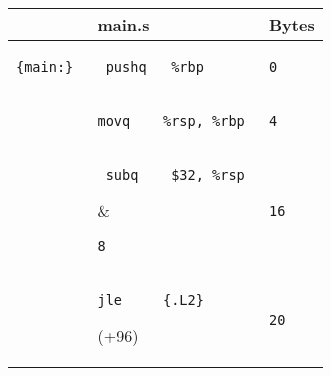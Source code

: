 \documentclass{ti2}
\begin{document}
\begin{tabular}{ | l | l | l|} \hline
  &  main.s & Bytes \\ \hline
\begin{lstlisting}
{main:} 
\end{lstlisting} &
\begin{lstlisting}
 pushq   %rbp 
\end{lstlisting} &
\begin{lstlisting}
0
\end{lstlisting} \\ \hline
\begin{lstlisting}

\end{lstlisting} &
\begin{lstlisting}
movq    %rsp, %rbp
\end{lstlisting} &
\begin{lstlisting}
4
\end{lstlisting} \\ \hline
&
\begin{lstlisting}
 subq    $32, %rsp 
\end{lstlisting} &
\begin{lstlisting}
8
\end{lstlisting} \\ \hline

\begin{lstlisting}

\end{lstlisting} &
\begin{lstlisting}
 movq    %rsi, -32(%rbp)
\end{lstlisting} &
\begin{lstlisting}
12
\end{lstlisting} \\ \hline

\begin{lstlisting}

\end{lstlisting} &
\begin{lstlisting}
cmpl    $1, -20(%rbp)
\end{lstlisting} &
\begin{lstlisting}
16
\end{lstlisting} \\ \hline

\begin{lstlisting}

\end{lstlisting} &
\begin{lstlisting}
jle     {.L2}
\end{lstlisting} \color{blue}(+96)&
\begin{lstlisting}
20
\end{lstlisting} \\ \hline


\end{tabular}
\end{document}
